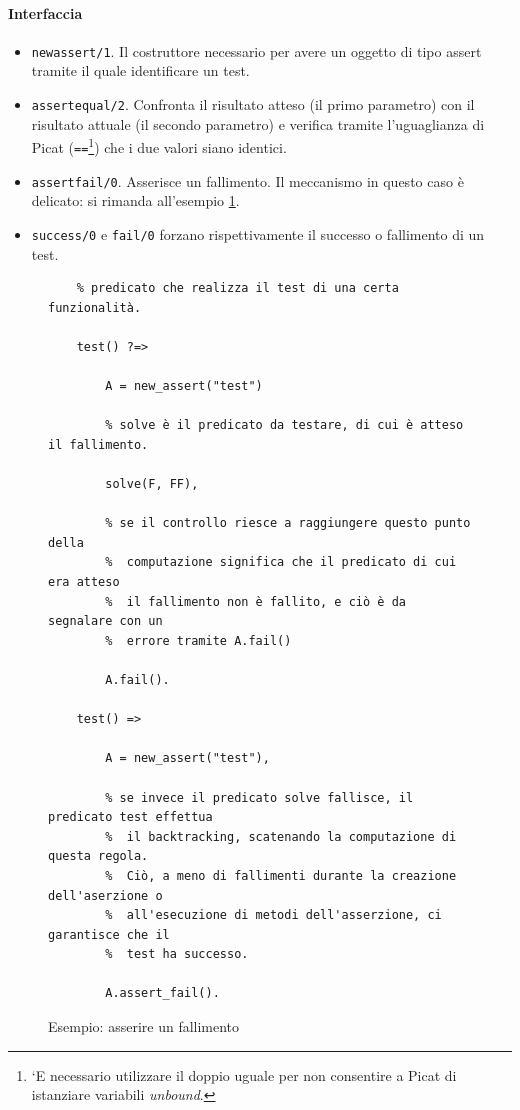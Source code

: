 \documentclass[12pt,a4paper,openright]{book} %
\begin{document}
\paragraph{Interfaccia}
\begin{itemize}
	\item \texttt{new\textunderscore assert/1}. Il costruttore
          necessario per avere un oggetto di tipo assert tramite il
          quale identificare un test.
	\item \texttt{assert\textunderscore equal/2}. Confronta il
          risultato atteso (il primo parametro) con il risultato
          attuale (il secondo parametro) e verifica tramite
          l'uguaglianza di Picat (\texttt{==}\footnote{`E necessario
            utilizzare il doppio uguale per non consentire a Picat di
            istanziare variabili \emph{unbound}.}) che i due valori
          siano identici.
	\item \texttt{assert\textunderscore fail/0}. Asserisce un
          fallimento. Il meccanismo in questo caso è delicato: si
          rimanda all'esempio \ref{fig:example_unittest_assertfail}.
	\item \texttt{success/0} e \texttt{fail/0} forzano
          rispettivamente il successo o fallimento di un test.
\end{itemize}

\begin{figure}
	\begin{verbatim}
	% predicato che realizza il test di una certa funzionalità.

	test() ?=>

	    A = new_assert("test")

	    % solve è il predicato da testare, di cui è atteso il fallimento.

	    solve(F, FF),

	    % se il controllo riesce a raggiungere questo punto della
	    %  computazione significa che il predicato di cui era atteso
	    %  il fallimento non è fallito, e ciò è da segnalare con un
	    %  errore tramite A.fail()

	    A.fail().

	test() =>

	    A = new_assert("test"),

	    % se invece il predicato solve fallisce, il predicato test effettua
	    %  il backtracking, scatenando la computazione di questa regola.
	    %  Ciò, a meno di fallimenti durante la creazione dell'aserzione o
	    %  all'esecuzione di metodi dell'asserzione, ci garantisce che il
	    %  test ha successo.

	    A.assert_fail().
	\end{verbatim}
 	\caption{Esempio: asserire un fallimento}
	\label{fig:example_unittest_assertfail}
\end{figure}
\end{document}
